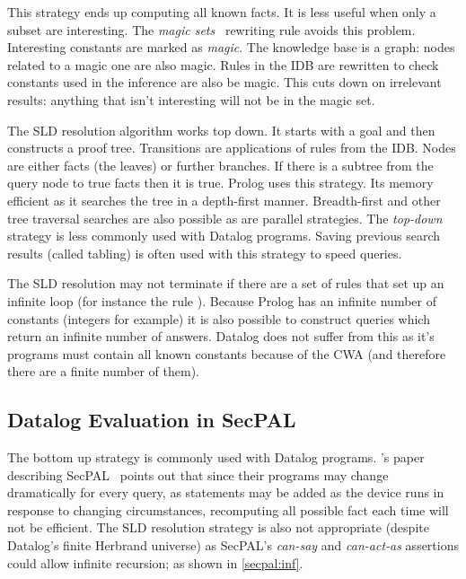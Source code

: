 \documentclass[a4paper,sfsidenotes]{%
  article%
}
\begin{document}
This strategy ends up computing all known facts. It is less useful when only a
subset are interesting.  The \emph{magic sets}~\cite{Bancilhon:1985cz} rewriting
rule avoids this problem.  Interesting constants are marked as \emph{magic}. The
knowledge base is a graph: nodes related to a magic one are also magic.  Rules
in the \ac{IDB} are rewritten to check constants used in the inference are also
be magic.  This cuts down on irrelevant results: anything that isn't
interesting will not be in the magic set.

The \ac{SLD} resolution algorithm works top down. It starts with a goal and then
constructs a proof tree. Transitions are applications of rules from the
\ac{IDB}. Nodes are either facts (the leaves) or further branches.  If there is
a subtree from the query node to true facts then it is true.  Prolog uses this
strategy.  Its memory efficient as it searches the tree in a depth-first manner.
Breadth-first and other tree traversal searches are also possible as are
parallel strategies.  The \emph{top-down} strategy is less commonly used with
Datalog programs. Saving previous search results (called tabling) is often used
with this strategy to speed queries.


The \ac{SLD} resolution may not terminate if there are a set of rules that set
up an infinite loop (for instance the rule ).  Because
Prolog has an infinite number of constants (integers for example) it is also
possible to construct queries which return an infinite number of answers.
Datalog does not suffer from this as it's programs must contain all known
constants because of the \ac{CWA} (and therefore there are a finite number of
them).


\subsection{Datalog Evaluation in SecPAL}

The bottom up strategy is commonly used with Datalog programs.
\citeauthor*{Becker:2009vt}'s paper describing SecPAL~\cite{Becker:2006vh}
points out that since their programs may change dramatically for every query, as
statements may be added as the device runs in response to changing
circumstances, recomputing all possible fact each time  will not be efficient.
The \ac{SLD} resolution strategy is also not appropriate (despite Datalog's
finite Herbrand universe) as SecPAL's \emph{can-say} and \emph{can-act-as}
assertions could allow infinite recursion; as shown in \autoref{secpal:inf}.
\end{document}
